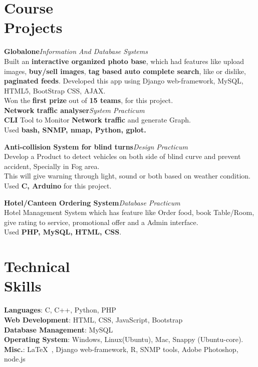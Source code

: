 \documentclass[a4paper,margin,line]{resume}
\begin{document}
\begin{resume}
	\section{\mysidestyle Course\\Projects}
	\textbf{Globalone}\hfill \textsl{Information And Database Systems}\vspace{1.0mm}\\%
	Built an \textbf{interactive organized photo base}, which had features like upload images, \textbf{buy/sell images}, \textbf{tag based auto complete search}, like or dislike, \textbf{paginated feeds}. Developed this app using Django web-framework, MySQL, HTML5, BootStrap CSS, AJAX.\\ Won the \textbf{first prize} out of \textbf{15 teams}, for this project.\\%

	\textbf{Network traffic analyser}\hfill \textsl{System Practicum}\vspace{1.0mm}\\%
	\textbf{CLI} Tool to Monitor \textbf{Network traffic} and generate Graph.\\
	Used \textbf{bash, SNMP, nmap, Python, gplot.}\\%

\pagebreak

	\textbf{Anti-collision System for blind turns}\hfill \textsl{Design Practicum}\vspace{1.0mm}\\%
	Develop a Product to detect vehicles on both side of blind curve and prevent accident, Specially in Fog area.\\
	This will give warning through light, sound or both based on weather condition.\\
	Used\textbf{ C, Arduino} for this project.%
	
	\textbf{Hotel/Canteen Ordering System}\hfill \textsl{Database Practicum}\vspace{1.0mm}\\
	Hotel Management System which has feature like Order food, book Table/Room, give rating to service, promotional offer and a Admin interface.\\
	Used\textbf{ PHP, MySQL, HTML, CSS}.%

	\section{\mysidestyle Technical\\Skills}
	\textbf{Languages}: C, C++, Python, PHP\\%
	\textbf{Web Development}: HTML, CSS, JavaScript, Bootstrap\\%
 	\textbf{Database Management}: MySQL\\%
 	\textbf{Operating System}: Windows, Linux(Ubuntu), Mac, Snappy (Ubuntu-core). \\%
 	\textbf{Misc.}:  \LaTeX\ , Django web-framework, R, SNMP tools, Adobe Photoshop, node.js \\%


\end{resume}
\end{document}
